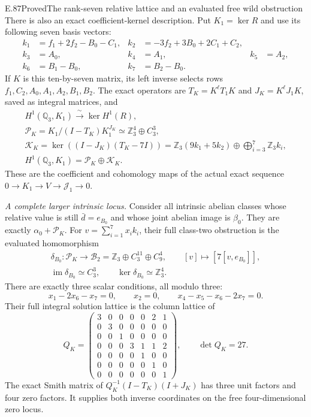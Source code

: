 \begin{statement}{E.87}{Proved}{The rank-seven relative lattice and an evaluated free wild obstruction}
There is also an exact coefficient-kernel description.
Put $K_1=\ker R$ and use its following seven basis vectors:
\[
 \begin{aligned}
 k_1&=f_1+2f_2-B_0-C_1,&
 k_2&=-3f_2+3B_0+2C_1+C_2,\\
 k_3&=A_0,&k_4&=A_1,&k_5&=A_2,\\
 k_6&=B_1-B_0,&k_7&=B_2-B_0.
 \end{aligned}
 \tag{E87.9}
\]
If $K$ is this ten-by-seven matrix, its left inverse
selects rows $f_1,C_2,A_0,A_1,A_2,B_1,B_2$.
The exact operators are $T_K=K^\ell T_1K$ and
$J_K=K^\ell J_1K$, saved as integral matrices, and
\[
 \begin{gathered}
 H^1(\mathbb Q_3,K_1)
    \xrightarrow{\ \sim\ }\ker H^1(R),\\
 \mathcal P_K=K_1/(I-T_K)K_1^{J_K}
       \simeq\mathbb Z_3^4\oplus C_3^3,\\
 \mathcal K_K=
  \ker((I-J_K)(T_K-7I))
       =\mathbb Z_3(9k_1+5k_2)
                    \oplus\bigoplus_{i=3}^7\mathbb Z_3k_i,\\
 H^1(\mathbb Q_3,K_1)=\mathcal P_K\oplus\mathcal K_K.
 \end{gathered}
 \tag{E87.10}
\]
These are the coefficient and cohomology maps of
the actual exact sequence $0\to K_1\to V\to\mathcal J_1\to0$.

\emph{A complete larger intrinsic locus.}
Consider all intrinsic abelian classes whose relative
value is still $\bar d=e_{B_0}$ and whose joint
abelian image is $\beta_0$. They are exactly
$\alpha_0+\mathcal P_K$. For
$v=\sum_{i=1}^7x_i k_i$, their full class-two
obstruction is the evaluated homomorphism
\[
 \begin{gathered}
 \delta_{B_0}:\mathcal P_K\longrightarrow
    \mathcal B_2=\mathbb Z_3\oplus C_3^{11}\oplus C_9^4,
        \qquad [v]\longmapsto[7[v,e_{B_0}]],\\
 \operatorname{im}\delta_{B_0}\simeq C_3^3,
       \qquad\ker\delta_{B_0}\simeq\mathbb Z_3^4.
 \end{gathered}
 \tag{E87.11}
\]
There are exactly three scalar conditions, all modulo three:
\[
 x_1-2x_6-x_7=0,\qquad x_2=0,\qquad
 x_4-x_5-x_6-2x_7=0.
 \tag{E87.12}
\]
Their full integral solution lattice is the column
lattice of
\[
 Q_K=\begin{pmatrix}
 3&0&0&0&0&2&1\\0&3&0&0&0&0&0\\
 0&0&1&0&0&0&0\\0&0&0&3&1&1&2\\
 0&0&0&0&1&0&0\\0&0&0&0&0&1&0\\
 0&0&0&0&0&0&1
 \end{pmatrix},\qquad\det Q_K=27.
 \tag{E87.13}
\]
The exact Smith matrix of
$Q_K^{-1}(I-T_K)(I+J_K)$ has three unit factors
and four zero factors. It supplies both inverse
coordinates on the free four-dimensional zero locus.


\end{statement}
